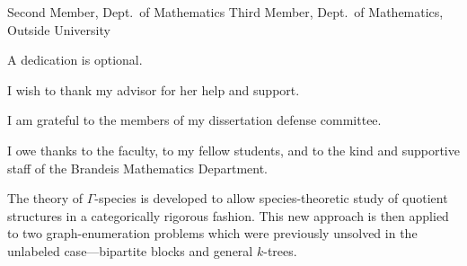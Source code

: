 \documentclass[distribution,draft]{brandiss} %
\numberwithin{section}{chapter}
\numberwithin{figure}{chapter}
\begin{document}

\frontmatter

\makedisstitle

\begin{disssignatures}
  \committeemember Second Member, Dept.~of Mathematics
  \committeemember Third Member, Dept.~of Mathematics, Outside University
\end{disssignatures}

\disscopyright %

\begin{dissdedication}
  A dedication is optional.
\end{dissdedication}

\begin{dissacknowledgments} %
  I wish to thank my advisor for her help and support.

  I am grateful to the members of my dissertation defense committee.
  
  I owe thanks to the faculty, to my fellow students, and to the kind
  and supportive staff of the Brandeis Mathematics Department.
\end{dissacknowledgments}

\begin{dissabstract}
  The theory of $\Gamma$-species is developed to allow species-theoretic study of quotient structures in a categorically rigorous fashion.
  This new approach is then applied to two graph-enumeration problems which were previously unsolved in the unlabeled case---bipartite blocks and general $k$-trees.
\end{dissabstract}
\end{document}
